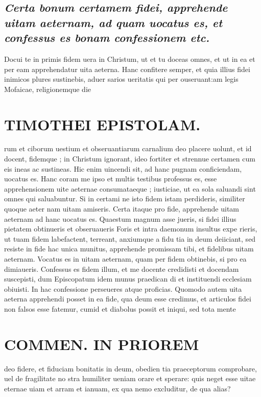 \documentclass{article}
\begin{document}
\begin{pages}
\subsection*{\textit{Certa bonum certamem fidei, apprehende uitam aeternam, ad quam uocatus es, et confessus es bonam confessionem etc. }}\pstart Docui te in primis fidem uera in Christum, ut et tu doceas omnes, et ut in ea et per eam apprehendatur uita aeterna. Hanc confitere semper, et quia illius fidei inimicos plures sustinebis, aduer sarios ueritatis qui per ouseruant:am legis Mofaicae, religionemque die\pend
\section*{TIMOTHEI EPISTOLAM. }
\marginpar{[ p.171 ]}\pstart rum et ciborum uestium et obseruantiarum carnalium deo placere uolunt, et id docent, fidemque ; in Christum ignorant, ideo fortiter et strennue certamen cum eis ineas ac sustineas. Hic enim uincendi sit, ad hanc pugnam conficiendam, uocatus es. Hanc coram me ipso et multis testibus professus es, esse apprehensionem uite aeternae consumataeque ; iusticiae, ut ea sola saluandi sint omnes qui saluabuntur. Si in certami ne isto fidem istam perdideris, similiter quoque aeter nam uitam amiseris. Certa itaque pro fide, apprehende uitam aeternam ad hanc uocatus es. Quaestum magnum asse jueris, si fidei illius pietatem obtinueris et obseruaueris Foris et intra daemonum insultus expe rieris, ut tuam fidem labefactent, terreant, anxiumque a fidu tia in deum deiiciant, sed resiste in fide hac unica munitus, apprehende promissam tibi, et fidelibus uitam aeternam. Vocatus es in uitam aeternam, quam per fidem obtinebis, si pro ea dimiaueris. Confessus es fidem illum, et me docente credidisti et docendam suscepisti, dum Episcopatum idem munus praedican di et instituendi ecclesiam obiuisti. In hac confessione perseueres atque proficias. Quomodo autem uita aeterna apprehendi posset in ea fide, qua deum esse credimus, et articulos fidei non falsos esse fatemur, cumid et diabolus possit et iniqui, sed tota mente  \pend
\section*{COMMEN. IN PRIOREM }
\marginpar{[ p.172 ]}\pstart deo fidere, et fiduciam bonitatis in deum, obedien tia praeceptorum comprobare, uel de fragilitate no stra humiliter ueniam orare et sperare: quis neget esse uitae eternae uiam et arram et ianuam, ex qua nemo excluditur, de qua alias?  \pend
{}
{}

\end{pages}
\end{document}
